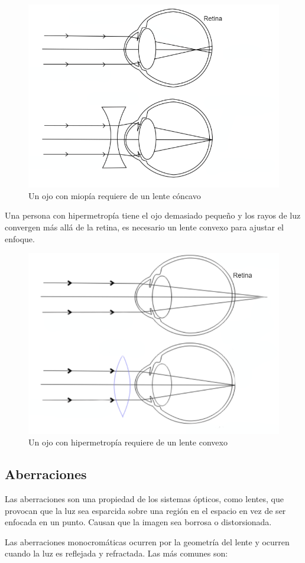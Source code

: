 \documentclass{article}
\begin{document}
\begin{figure}[H]
	\centering
	\includegraphics[width=0.6\linewidth]{Figuras/Miopia}
	\caption{Un ojo con miopía requiere de un lente cóncavo}
	\label{fig:miopia}
\end{figure}

Una persona con hipermetropía tiene el ojo demasiado pequeño y los rayos de luz convergen más allá de la retina, es necesario un lente convexo para ajustar el enfoque.

\begin{figure}[H]
	\centering
	\includegraphics[width=0.6\linewidth]{Figuras/Hipermetropia}
	\caption{Un ojo con hipermetropía requiere de un lente convexo}
	\label{fig:hipermetropia}
\end{figure}


\subsection{Aberraciones}

Las aberraciones son una propiedad de los sistemas ópticos, como lentes, que provocan que la luz sea esparcida sobre una región en el espacio en vez de ser enfocada en un punto. Causan que la imagen sea borrosa o distorsionada.

Las aberraciones monocromáticas ocurren por la geometría del lente y ocurren cuando la luz es reflejada y refractada. Las más comunes son:
\end{document}
